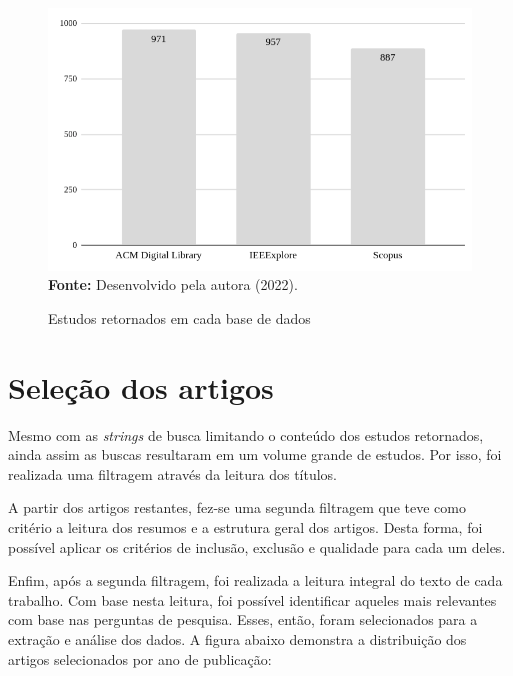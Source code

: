 \documentclass[
    12pt,       %
    openright,      %
    twoside,      %
    a4paper,      %
    english,      %
    french,       %
    spanish,      %
    brazil,       %
    ]{abntex2}
\begin{document}
\begin{figure}[h]
    \centering
    \caption{Estudos retornados em cada base de dados}
    \includegraphics[scale=0.55]{src/tex/img/graficoBuscas.png} \\
    \label{EstudosRetornados}
    \textbf{Fonte:} Desenvolvido pela autora (2022).
    \centering
\end{figure}

\section{Seleção dos artigos}

Mesmo com as \textit{strings} de busca limitando o conteúdo dos estudos retornados, ainda assim as buscas resultaram em um volume grande de estudos. Por isso, foi realizada uma filtragem através da leitura dos títulos.

A partir dos artigos restantes, fez-se uma segunda filtragem que teve como critério a leitura dos resumos e a estrutura geral dos artigos. Desta forma, foi possível aplicar os critérios de inclusão, exclusão e qualidade para cada um deles. 

Enfim, após a segunda filtragem, foi realizada a leitura integral do texto de cada trabalho. Com base nesta leitura, foi possível identificar aqueles mais relevantes com base nas perguntas de pesquisa. Esses, então, foram selecionados para a extração e análise dos dados. A figura abaixo demonstra a distribuição dos artigos selecionados por ano de publicação:
\end{document}
